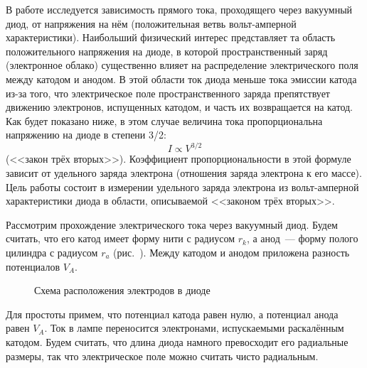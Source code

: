 
В работе исследуется зависимость прямого тока, проходящего через вакуумный диод, от напряжения на нём (положительная ветвь вольт-амперной характеристики). Наибольший физический интерес представляет та область положительного напряжения на диоде, в которой пространственный заряд (электронное облако) существенно влияет на распределение электрического поля между катодом и анодом. В этой области ток диода меньше тока эмиссии катода из-за того, что электрическое поле пространственного заряда препятствует движению электронов, испущенных катодом, и часть их возвращается на катод. Как будет показано ниже, в этом случае величина тока пропорциональна напряжению на диоде в степени 3/2:
\begin{equation}
	I\propto V^{3/2}
\end{equation}
(<<закон трёх вторых>>). Коэффициент пропорциональности в этой формуле зависит от удельного заряда электрона (отношения заряда электрона к его массе). Цель работы состоит в измерении удельного заряда электрона из вольт-амперной характеристики диода в области, описываемой <<законом трёх вторых>>.

Рассмотрим прохождение электрического тока через вакуумный диод. Будем считать, что его катод имеет форму нити с
радиусом $r_k$, а анод~--- форму полого цилиндра с радиусом $r_a$ (рис.~). Между катодом и анодом приложена разность потенциалов $V_A$.
\begin{figure}[h!]
	\caption{Схема расположения электродов в диоде}
\end{figure}

Для простоты примем, что потенциал катода равен нулю, а потенциал анода равен $V_A$. Ток в лампе переносится
электронами, испускаемыми раскалённым катодом. Будем считать, что длина диода намного превосходит его радиальные
размеры, так что электрическое поле можно считать чисто радиальным.

